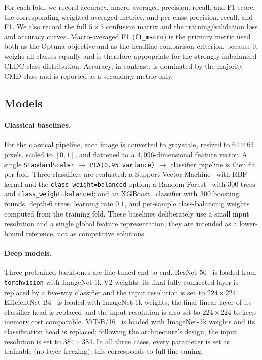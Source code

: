 \documentclass[conference]{IEEEtran}
\begin{document}
For each fold, we record accuracy, macro-averaged precision, recall, and F1-score, the corresponding weighted-averaged metrics, and per-class precision, recall, and F1. We also record the full $5{\times}5$ confusion matrix and the training/validation loss and accuracy curves. Macro-averaged F1 (\texttt{f1\_macro}) is the primary metric used both as the Optuna objective and as the headline comparison criterion, because it weighs all classes equally and is therefore appropriate for the strongly imbalanced CLDC class distribution. Accuracy, in contrast, is dominated by the majority CMD class and is reported as a secondary metric only.

\subsection{Models}
\label{ssec:models}

\paragraph{Classical baselines.}
For the classical pipeline, each image is converted to grayscale, resized to $64{\times}64$ pixels, scaled to $[0,1]$, and flattened to a $4{,}096$-dimensional feature vector. A single \texttt{StandardScaler} $\rightarrow$ \texttt{PCA(0.95 variance)} $\rightarrow$ classifier pipeline is then fit per fold. Three classifiers are evaluated: a Support Vector Machine~\cite{cortes1995svm} with RBF kernel and the \texttt{class\_weight=balanced} option; a Random Forest~\cite{breiman2001randomforests} with $300$ trees and \texttt{class\_weight=balanced}; and an XGBoost~\cite{chen2016xgboost} classifier with $300$ boosting rounds, depth-$6$ trees, learning rate $0.1$, and per-sample class-balancing weights computed from the training fold. These baselines deliberately use a small input resolution and a single global feature representation; they are intended as a lower-bound reference, not as competitive solutions.

\paragraph{Deep models.}
Three pretrained backbones are fine-tuned end-to-end. ResNet-50~\cite{he2016resnet} is loaded from \texttt{torchvision} with ImageNet-1k V2 weights; its final fully connected layer is replaced by a five-way classifier and the input resolution is set to $224{\times}224$. EfficientNet-B4~\cite{tan2019efficientnet} is loaded with ImageNet-1k weights; the final linear layer of its classifier head is replaced and the input resolution is also set to $224{\times}224$ to keep memory cost comparable. ViT-B/16~\cite{dosovitskiy2021vit} is loaded with ImageNet-1k weights and its classification head is replaced; following the architecture's design, the input resolution is set to $384{\times}384$. In all three cases, every parameter is set as trainable (no layer freezing); this corresponds to full fine-tuning.
\end{document}
